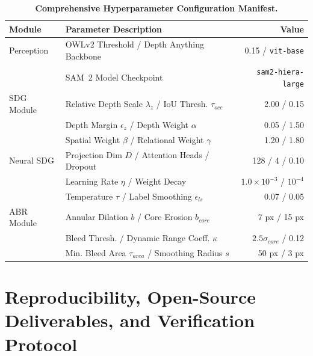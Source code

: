 \documentclass[10pt,twocolumn,letterpaper]{article}
\begin{document}
\begin{table}[ht]
\centering
\scriptsize
\renewcommand{\arraystretch}{0.88}
\caption{\textbf{Comprehensive Hyperparameter Configuration Manifest.}}
\label{tab:hyperparams}
\begin{tabularx}{\columnwidth}{lXr}
\toprule
\textbf{Module} & \textbf{Parameter Description} & \textbf{Value} \\
\midrule
Perception & OWLv2 Threshold / Depth Anything Backbone & 0.15 / \texttt{vit-base} \\
           & SAM~2 Model Checkpoint & \texttt{sam2-hiera-large} \\
\midrule
SDG Module & Relative Depth Scale $\lambda_z$ / IoU Thresh. $\tau_{occ}$ & 2.00 / 0.15 \\
           & Depth Margin $\epsilon_z$ / Depth Weight $\alpha$ & 0.05 / 1.50 \\
           & Spatial Weight $\beta$ / Relational Weight $\gamma$ & 1.20 / 1.80 \\
\midrule
Neural SDG & Projection Dim $D$ / Attention Heads / Dropout & 128 / 4 / 0.10 \\
           & Learning Rate $\eta$ / Weight Decay & $1.0\times 10^{-3}$ / $10^{-4}$ \\
           & Temperature $\tau$ / Label Smoothing $\epsilon_{ls}$ & 0.07 / 0.05 \\
\midrule
ABR Module & Annular Dilation $b$ / Core Erosion $b_{core}$ & 7 px / 15 px \\
           & Bleed Thresh. / Dynamic Range Coeff. $\kappa$ & $2.5\sigma_{core}$ / 0.12 \\
           & Min. Bleed Area $\tau_{area}$ / Smoothing Radius $s$ & 50 px / 3 px \\
\bottomrule
\end{tabularx}
\end{table}

\section{Reproducibility, Open-Source Deliverables, and Verification Protocol}
\label{app:reproducibility}
\end{document}
